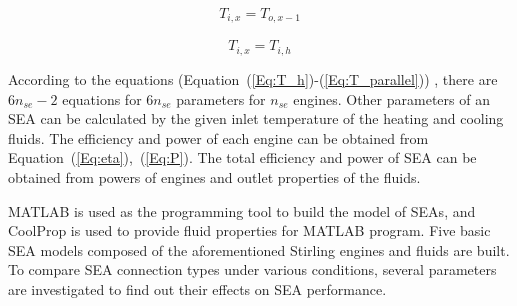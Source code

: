 \begin{equation}
	\begin{split}
		T_{i,x} = T_{o,x-1}
		\label{Eq:T_serial}
	\end{split}
\end{equation}

\begin{equation}
	T_{i,x} = T_{i,h}
	\label{Eq:T_parallel}
\end{equation}

According to the equations 
(Equation~(\ref{Eq:T_h})-(\ref{Eq:T_parallel}))
, there are $6n_{se} - 2$ equations for $6n_{se}$ parameters for $n_{se}$ engines. Other parameters of an SEA can be calculated by the given inlet temperature of the heating and cooling fluids. The efficiency and power of each engine can be obtained from Equation~(\ref{Eq:eta}),~(\ref{Eq:P}). The total efficiency and power of SEA can be obtained from powers of engines and outlet properties of the fluids.

MATLAB is used as the programming tool to build the model of SEAs, and CoolProp is used to provide fluid properties for MATLAB program. Five basic SEA models composed of the aforementioned Stirling engines and fluids are built. To compare SEA connection types under various conditions, several parameters are investigated to find out their effects on SEA performance.

